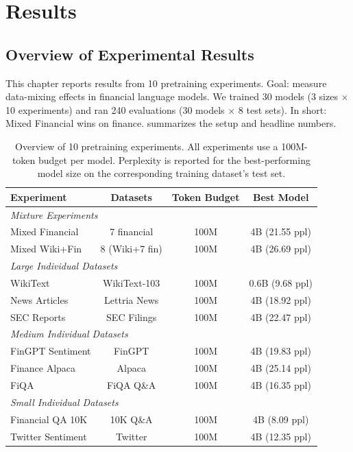 \chapter{Results}


\section{Overview of Experimental Results}

This chapter reports results from 10 pretraining experiments. Goal: measure data-mixing effects in financial language models. We trained 30 models (3 sizes $\times$ 10 experiments) and ran 240 evaluations (30 models $\times$ 8 test sets). In short: Mixed Financial wins on finance.  summarizes the setup and headline numbers.

\begin{table}[h]
\centering
\small
\begin{tabular}{lccc}
\toprule
\textbf{Experiment} & \textbf{Datasets} & \textbf{Token Budget} & \textbf{Best Model} \\
\midrule
\multicolumn{4}{l}{\textit{Mixture Experiments}} \\
Mixed Financial & 7 financial & 100M & 4B (21.55 ppl) \\
Mixed Wiki+Fin & 8 (Wiki+7 fin) & 100M & 4B (26.69 ppl) \\
\midrule
\multicolumn{4}{l}{\textit{Large Individual Datasets}} \\
WikiText & WikiText-103 & 100M & 0.6B (9.68 ppl) \\
News Articles & Lettria News & 100M & 4B (18.92 ppl) \\
SEC Reports & SEC Filings & 100M & 4B (22.47 ppl) \\
\midrule
\multicolumn{4}{l}{\textit{Medium Individual Datasets}} \\
FinGPT Sentiment & FinGPT & 100M & 4B (19.83 ppl) \\
Finance Alpaca & Alpaca & 100M & 4B (25.14 ppl) \\
FiQA & FiQA Q\&A & 100M & 4B (16.35 ppl) \\
\midrule
\multicolumn{4}{l}{\textit{Small Individual Datasets}} \\
Financial QA 10K & 10K Q\&A & 100M & 4B (8.09 ppl) \\
Twitter Sentiment & Twitter & 100M & 4B (12.35 ppl) \\
\bottomrule
\end{tabular}
\caption[Overview of Pretraining Experiments]{Overview of 10 pretraining experiments. All experiments use a 100M-token budget per model. Perplexity is reported for the best-performing model size on the corresponding training dataset's test set.}
\label{tab:experiments_overview}
\end{table}

